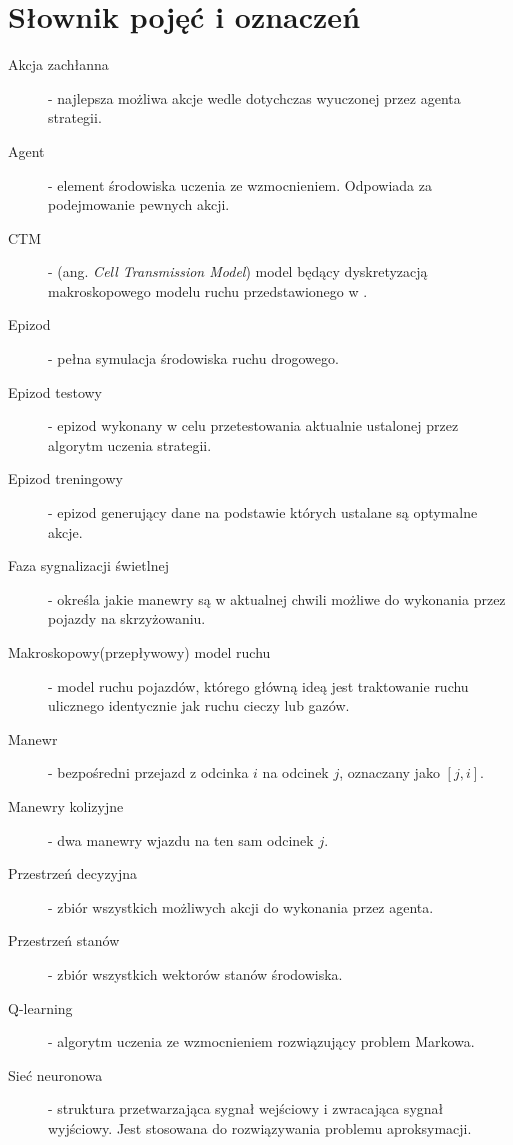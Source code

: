 \documentclass[12pt]{book}
\theoremstyle{plain}
\newcommand\blankpage{%
	\null
	\thispagestyle{empty}%
	\addtocounter{page}{-1}%
	\newpage}
\begin{document}
\raggedbottom
\afterpage{\blankpage}
\chapter{Słownik pojęć i oznaczeń}
\begin{description}
	\item[Akcja zachłanna] - najlepsza możliwa akcje wedle dotychczas wyuczonej przez agenta strategii.
	\item[Agent] - element środowiska uczenia ze wzmocnieniem. Odpowiada za podejmowanie pewnych akcji.
	\item [CTM] - (ang. \emph{Cell Transmission Model}) model będący dyskretyzacją makroskopowego modelu ruchu przedstawionego w \cite{lwr}.
	\item[Epizod] - pełna symulacja środowiska ruchu drogowego.
	\item[Epizod testowy] - epizod wykonany w celu przetestowania aktualnie ustalonej przez algorytm uczenia strategii.
	\item[Epizod treningowy] - epizod generujący dane na podstawie których ustalane są optymalne akcje.
	\item[Faza sygnalizacji świetlnej] - określa jakie manewry są w aktualnej chwili możliwe do wykonania przez pojazdy na skrzyżowaniu.
	\item [Makroskopowy(przepływowy) model ruchu] - model ruchu pojazdów, którego główną ideą jest traktowanie ruchu ulicznego identycznie jak ruchu cieczy lub gazów.
	\item[Manewr] - bezpośredni przejazd z odcinka $i$ na odcinek $j$, oznaczany jako $[j,i]$.
	\item[Manewry kolizyjne] - dwa manewry wjazdu na ten sam odcinek $j$.
	\item[Przestrzeń decyzyjna] - zbiór wszystkich możliwych akcji do wykonania przez agenta.
	\item[Przestrzeń stanów] - zbiór wszystkich wektorów stanów środowiska.
	\item[Q-learning] - algorytm uczenia ze wzmocnieniem rozwiązujący problem Markowa.
	\item[Sieć neuronowa] - struktura przetwarzająca sygnał wejściowy i zwracająca sygnał wyjściowy. Jest stosowana do rozwiązywania problemu aproksymacji.

\end{description}
\end{document}
